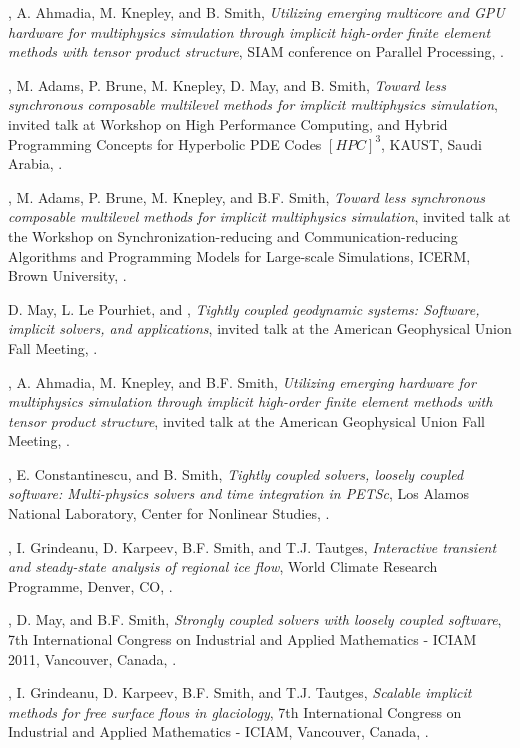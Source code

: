 \documentclass[10pt,letterpaper]{article}
\newcommand\ptitle[1]{\textit{#1}} %
\renewenvironment{itemize}{
  \begin{list}{}{
    \setlength{\leftmargin}{1.5em}
    \setlength{\itemsep}{0.25em}
    \setlength{\parskip}{0pt}
    \setlength{\parsep}{0.25em}
  }
}{
  \end{list}
}
\begin{document}
\begin{itemize}
\item {\JedBrown}, A. Ahmadia, M. Knepley, and B. Smith, \ptitle{Utilizing emerging multicore and GPU hardware for multiphysics simulation through implicit high-order finite element methods with tensor product structure}, SIAM conference on Parallel Processing, .
\item {\JedBrown}, M. Adams, P. Brune, M. Knepley, D. May, and B. Smith, \ptitle{Toward less synchronous composable multilevel methods for implicit multiphysics simulation}, invited talk at Workshop on High Performance Computing, and Hybrid Programming Concepts for Hyperbolic PDE Codes $[HPC]^3$, KAUST, Saudi Arabia, .
\item {\JedBrown}, M. Adams, P. Brune, M. Knepley, and B.F. Smith, \ptitle{Toward less synchronous composable multilevel methods for implicit multiphysics simulation}, invited talk at the Workshop on Synchronization-reducing and Communication-reducing Algorithms and Programming Models for Large-scale Simulations, ICERM, Brown University, .
\item D. May, L. Le Pourhiet, and {\JedBrown}, \ptitle{Tightly coupled geodynamic systems: Software, implicit solvers, and applications}, invited talk at the American Geophysical Union Fall Meeting, .
\item {\JedBrown}, A. Ahmadia, M. Knepley, and B.F. Smith, \ptitle{Utilizing emerging hardware for multiphysics simulation through implicit high-order finite element methods with tensor product structure}, invited talk at the American Geophysical Union Fall Meeting, .
\item {\JedBrown}, E. Constantinescu, and B. Smith, \ptitle{Tightly coupled solvers, loosely coupled software: Multi-physics solvers and time integration in PETSc}, Los Alamos National Laboratory, Center for Nonlinear Studies, .
\item {\JedBrown}, I. Grindeanu, D. Karpeev, B.F. Smith, and T.J. Tautges, \ptitle{Interactive transient and steady-state analysis of regional ice flow}, World Climate Research Programme, Denver, CO, .
\item {\JedBrown}, D. May, and B.F. Smith, \ptitle{Strongly coupled solvers with loosely coupled software}, 7th International Congress on Industrial and Applied Mathematics - ICIAM 2011, Vancouver, Canada, .
\item {\JedBrown}, I. Grindeanu, D. Karpeev, B.F. Smith, and T.J. Tautges, \ptitle{Scalable implicit methods for free surface flows in glaciology}, 7th International Congress on Industrial and Applied Mathematics - ICIAM, Vancouver, Canada, .

\end{itemize}
\end{document}
